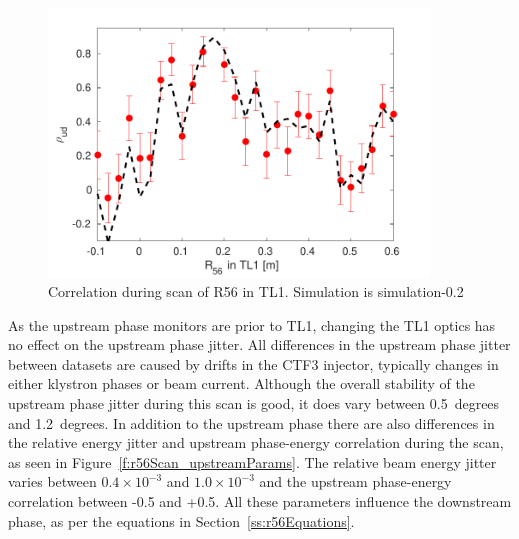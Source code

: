 \begin{figure}
  \centering
  \includegraphics[width=0.9\textwidth]{Figures/propagation/r56Scan_correlation}
  \caption{Correlation during scan of R56 in TL1. Simulation is simulation-0.2}
  \label{f:r56Scan_correlation}
\end{figure}

As the upstream phase monitors are prior to TL1, changing the TL1 optics has no effect on the upstream phase jitter. All differences in the upstream phase jitter between datasets are caused by drifts in the CTF3 injector, typically changes in either klystron phases or beam current. Although the overall stability of the upstream phase jitter during this scan is good, it does vary between 0.5~degrees and 1.2~degrees. In addition to the upstream phase there are also differences in the relative energy jitter and upstream phase-energy correlation during the scan, as seen in Figure~\ref{f:r56Scan_upstreamParams}. The relative beam energy jitter varies between \(0.4\times10^{-3}\) and \(1.0\times10^{-3}\) and the upstream phase-energy correlation between -0.5 and +0.5. All these parameters influence the downstream phase, as per the equations in Section~\ref{ss:r56Equations}.


